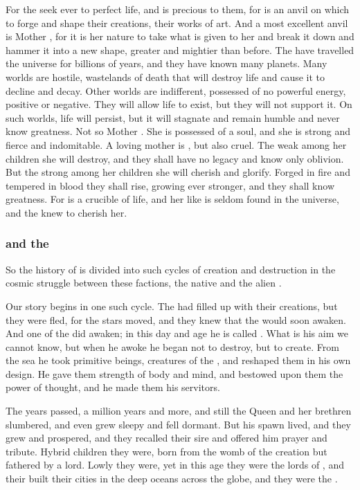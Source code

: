 For the \voyagers{} seek ever to perfect life, and \Miith{} is precious to them, for \Miith{} is an anvil on which to forge and shape their creations, their works of art. And a most excellent anvil is Mother \Miith{}, for it is her nature to take what is given to her and break it down and hammer it into a new shape, greater and mightier than before. The \voyagers{} have travelled the universe for billions of years, and they have known many planets. Many worlds are hostile, wastelands of death that will destroy life and cause it to decline and decay. Other worlds are indifferent, possessed of no powerful energy, positive or negative. They will allow life to exist, but they will not support it. On such worlds, life will persist, but it will stagnate and remain humble and never know greatness. Not so Mother \Miith{}. She is possessed of a soul, and she is strong and fierce and indomitable. A loving mother is \Miith{}, but also cruel. The weak among her children she will destroy, and they shall have no legacy and know only oblivion. But the strong among her children she will cherish and glorify. Forged in fire and tempered in blood they shall rise, growing ever stronger, and they shall know greatness. For \Miith{} is a crucible of life, and her like is seldom found in the universe, and the \voyagers{} knew to cherish her. 





\subsubsection{\Moroch{} and the \nagae}
So the history of \Miith{} is divided into such cycles of creation and destruction in the cosmic struggle between these factions, the native \krakens{} and the alien \voyagers{}. 

Our story begins in one such cycle. The \voyagers{} had filled \Miith{} up with their creations, but they were fled, for the stars moved, and they knew that the \krakens{} would soon awaken. And one of the \krakens{} did awaken; in this day and age he is called \Moroch{}. What is his aim we cannot know, but when he awoke he began not to destroy, but to create. From the sea he took primitive beings, creatures of the \voyagers{}, and reshaped them in his own design. He gave them strength of body and mind, and bestowed upon them the power of thought, and he made them his servitors. 

The years passed, a million years and more, and still the \Kraken{} Queen and her brethren slumbered, and even \Moroch{} grew sleepy and fell dormant. But his spawn lived, and they grew and prospered, and they recalled their sire and offered him prayer and tribute. Hybrid children they were, born from the womb of the \psp{\voyagers} creation but fathered by a \kraken{} lord. Lowly they were, yet in this age they were the lords of \Miith{}, and their built their cities in the deep oceans across the globe, and they were the \nagae{}. 















